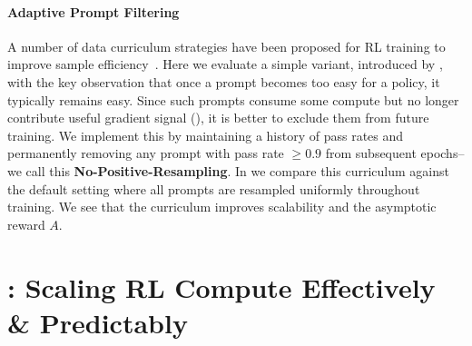 \paragraph{Adaptive Prompt Filtering}

A number of data curriculum strategies have been proposed for RL training to improve sample efficiency~\citep{polaris2025,speedrl,greso}. Here we evaluate a simple variant, introduced by \citet{polaris2025}, with the key observation that once a prompt becomes too easy for a policy, it typically remains easy.
Since such prompts consume some compute but no longer contribute useful gradient signal (), it is better to exclude them from future training. 
We implement this by maintaining a history of pass rates and permanently removing any prompt with pass rate $\geq 0.9$ from subsequent epochs--we call this \textbf{No-Positive-Resampling}.
In  we compare this curriculum against the default setting where all prompts are resampled uniformly throughout training. 
We see that the curriculum improves scalability and the asymptotic reward $A$.

\section{\scalerl: Scaling RL Compute Effectively \& Predictably}
\label{sec:loo}





